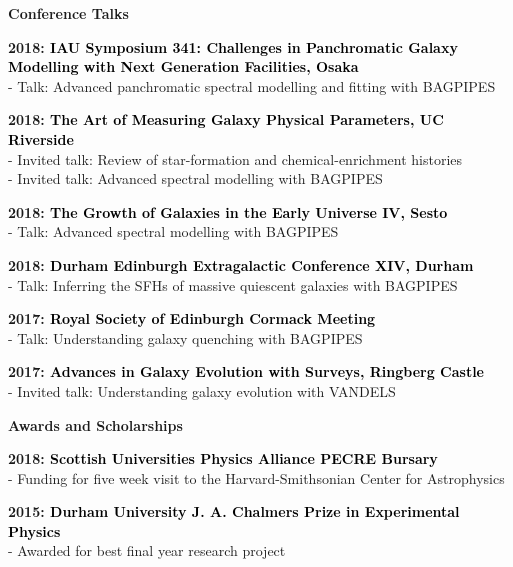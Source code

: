 \documentclass[a4paper,11pt,final]{memoir}
\newcommand{\Sep}{\vspace{1.5em}}
\newcommand{\SmallSep}{\vspace{0.5em}}
\newcommand{\CVSection}[1]
	{\Large\textbf{#1}\par
	\SmallSep\normalsize\normalfont}
\newcommand{\CVItem}[1]
	{\textbf{\color{RoyalBlue} #1}}
\begin{document}
\CVSection{Conference Talks}

\CVItem{2018: \textcolor{black}{IAU Symposium 341: Challenges in Panchromatic Galaxy Modelling with Next Generation Facilities, Osaka}}\\
 - Talk: Advanced panchromatic spectral modelling and fitting with BAGPIPES
 
 \SmallSep
 
\CVItem{2018: \textcolor{black}{The Art of Measuring Galaxy Physical Parameters, UC Riverside}}\\
 - Invited talk: Review of star-formation and chemical-enrichment histories\\
 - Invited talk: Advanced spectral modelling with BAGPIPES 
 
 \SmallSep

\CVItem{2018: \textcolor{black}{The Growth of Galaxies in the Early Universe IV, Sesto}}\\
 - Talk: Advanced spectral modelling with BAGPIPES
 
 \SmallSep

\CVItem{2018: \textcolor{black}{Durham Edinburgh Extragalactic Conference XIV, Durham}}\\
 - Talk: Inferring the SFHs of massive quiescent galaxies with BAGPIPES 
 
 \SmallSep

\CVItem{2017: \textcolor{black}{Royal Society of Edinburgh Cormack Meeting}}\\
 - Talk: Understanding galaxy quenching with BAGPIPES
 
  \SmallSep

\CVItem{2017: \textcolor{black}{Advances in Galaxy Evolution with Surveys, Ringberg Castle}}\\
 - Invited talk: Understanding galaxy evolution with VANDELS
 
\Sep

\CVSection{Awards and Scholarships}

\CVItem{2018: \textcolor{black}{Scottish Universities Physics Alliance PECRE Bursary}}\\
 - Funding for five week visit to the Harvard-Smithsonian Center for Astrophysics 
 
\SmallSep

\CVItem{2015: \textcolor{black}{Durham University J. A. Chalmers Prize in Experimental Physics}}\\
 - Awarded for best final year research project
 
\SmallSep
 
\end{document}

